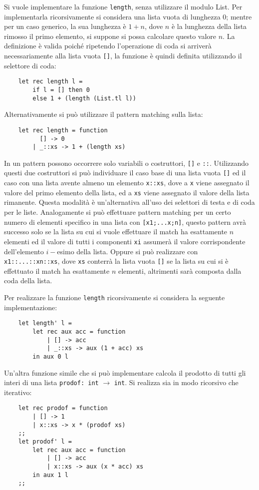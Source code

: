 \documentclass{article}
\numberwithin{equation}{subsection}
\begin{document}
Si vuole implementare la funzione \verb|length|, senza utilizzare il modulo List. Per implementarla ricorsivamente si considera una lista vuota di lunghezza 0; mentre per un caso generico, la sua lunghezza è $1+n$, dove $n$ è la lunghezza della lista rimosso il primo elemento, si suppone si possa calcolare questo valore $n$. 
La definizione è valida poiché ripetendo l'operazione di coda si arriverà necessariamente alla lista vuota \verb|[]|, la funzione è quindi definita utilizzando il selettore di coda:
\begin{verbatim}
    let rec length l = 
        if l = [] then 0
        else 1 + (length (List.tl l))
\end{verbatim}
Alternativamente si può utilizzare il pattern matching sulla lista:
\begin{verbatim}
    let rec length = function
          [] -> 0
        | _::xs -> 1 + (length xs)
\end{verbatim}
In un pattern possono occorrere solo variabili o costruttori, \verb|[]| e \verb|::|. Utilizzando questi due costruttori si può individuare il caso base di una lista vuota \verb|[]| ed il caso con una lista avente almeno un elemento \verb|x::xs|, dove a \verb|x| viene assegnato il valore del primo elemento della lista, ed a \verb|xs| viene assegnato il valore della lista rimanente. 
Questa modalità è un'alternativa all'uso dei selettori di testa e di coda per le liste. Analogamente si può effettuare pattern matching per un certo numero di elementi specifico in una lista con \verb|[x1;...x;n]|, questo pattern avrà successo solo se la lista su cui si vuole effettuare il match ha esattamente $n$ elementi ed il valore di tutti i componenti \verb|xi| assumerà il valore corrispondente dell'elemento $i-$esimo della lista. Oppure si può realizzare con \verb|x1::...::xn::xs|, dove \verb|xs| conterrà la lista vuota \verb|[]| se la lista su cui si è effettuato il match ha esattamente $n$ elementi, altrimenti sarà composta dalla coda della lista. 

Per realizzare la funzione \verb|length| ricorsivamente si considera la seguente implementazione:
\begin{verbatim}
    let length' l =
        let rec aux acc = function
            | [] -> acc
            | _::xs -> aux (1 + acc) xs
        in aux 0 l    
\end{verbatim}

Un'altra funzione simile che si può implementare calcola il prodotto di tutti gli interi di una lista \verb|prodof: int| $\rightarrow$ \verb|int|. Si realizza sia in modo ricorsivo che iterativo:
\begin{verbatim}
    let rec prodof = function
        | [] -> 1
        | x::xs -> x * (prodof xs)
    ;;
    let prodof' l = 
        let rec aux acc = function
            | [] -> acc
            | x::xs -> aux (x * acc) xs
        in aux 1 l
    ;;
\end{verbatim}
\end{document}
